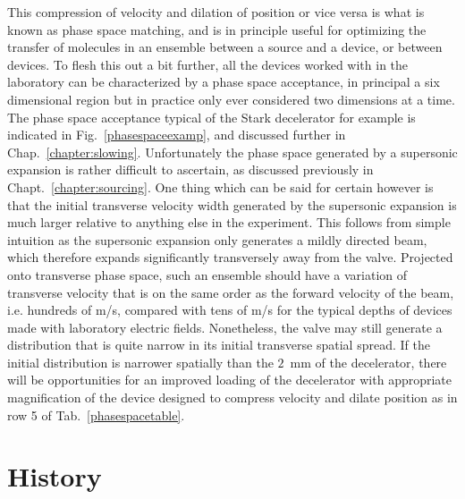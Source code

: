 This compression of velocity and dilation of position or vice versa is what is known as phase space matching, and is in principle useful for optimizing the transfer of molecules in an ensemble between a source and a device, or between devices.
To flesh this out a bit further, all the devices worked with in the laboratory can be characterized by a phase space acceptance, in principal a six dimensional region but in practice only ever considered two dimensions at a time.
The phase space acceptance typical of the Stark decelerator for example is indicated in Fig.~\ref{phasespaceexamp}, and discussed further in Chap.~\ref{chapter:slowing}.
Unfortunately the phase space generated by a supersonic expansion is rather difficult to ascertain, as discussed previously in Chapt.~\ref{chapter:sourcing}.
One thing which can be said for certain however is that the initial transverse velocity width generated by the supersonic expansion is much larger relative to anything else in the experiment.
This follows from simple intuition as the supersonic expansion only generates a mildly directed beam, which therefore expands significantly transversely away from the valve.
Projected onto transverse phase space, such an ensemble should have a variation of transverse velocity that is on the same order as the forward velocity of the beam, i.e. hundreds of m/s, compared with tens of m/s for the typical depths of devices made with laboratory electric fields.
Nonetheless, the valve may still generate a distribution that is quite narrow in its initial transverse spatial spread.
If the initial distribution is narrower spatially than the $2$~mm of the decelerator, there will be opportunities for an improved loading of the decelerator with appropriate magnification of the device designed to compress velocity and dilate position as in row 5 of Tab.~\ref{phasespacetable}.


\section{History}

